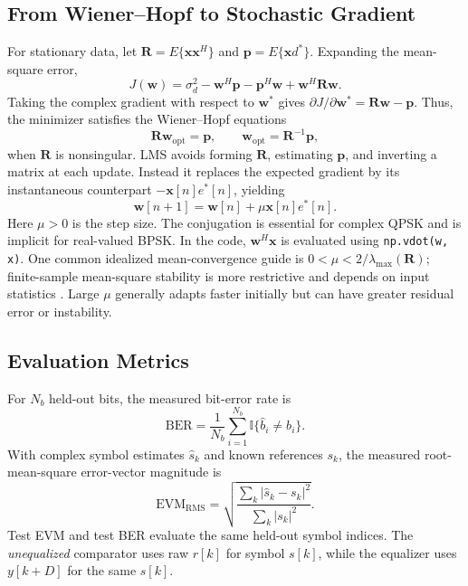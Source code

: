 \documentclass[conference,10pt]{IEEEtran}
\newcommand{\vect}[1]{\mathbf{#1}}
\begin{document}
\subsection{From Wiener--Hopf to Stochastic Gradient}
For stationary data, let $\vect{R}=E\{\vect{x}\vect{x}^H\}$ and $\vect{p}=E\{\vect{x}d^*\}$. Expanding the mean-square error,
\begin{equation}
 J(\vect{w})=\sigma_d^2-\vect{w}^H\vect{p}-\vect{p}^H\vect{w}
       +\vect{w}^H\vect{R}\vect{w}.
\end{equation}
Taking the complex gradient with respect to $\vect{w}^*$ gives $\partial J/\partial\vect{w}^*=\vect{R}\vect{w}-\vect{p}$. Thus, the minimizer satisfies the Wiener--Hopf equations
\begin{equation}
 \vect{R}\vect{w}_{\mathrm{opt}}=\vect{p},\qquad
 \vect{w}_{\mathrm{opt}}=\vect{R}^{-1}\vect{p},
 \label{eq:wiener}
\end{equation}
when $\vect{R}$ is nonsingular. LMS avoids forming $\vect{R}$, estimating $\vect{p}$, and inverting a matrix at each update. Instead it replaces the expected gradient by its instantaneous counterpart $-\vect{x}[n]e^*[n]$, yielding
\begin{equation}
 \boxed{\vect{w}[n+1]=\vect{w}[n]+\mu\vect{x}[n]e^*[n].}
 \label{eq:lms}
\end{equation}
Here $\mu>0$ is the step size. The conjugation is essential for complex QPSK and is implicit for real-valued BPSK. In the code, $\vect{w}^H\vect{x}$ is evaluated using \texttt{np.vdot(w, x)}. One common idealized mean-convergence guide is $0<\mu<2/\lambda_{\max}(\vect{R})$; finite-sample mean-square stability is more restrictive and depends on input statistics \cite{haykin2002}. Large $\mu$ generally adapts faster initially but can have greater residual error or instability.

\subsection{Evaluation Metrics}
For $N_b$ held-out bits, the measured bit-error rate is
\begin{equation}
 \mathrm{BER}=\frac{1}{N_b}\sum_{i=1}^{N_b}\mathbb{I}\{\hat b_i\ne b_i\}.
\end{equation}
With complex symbol estimates $\hat s_k$ and known references $s_k$, the measured root-mean-square error-vector magnitude is
\begin{equation}
 \mathrm{EVM}_{\mathrm{RMS}}=\sqrt{\frac{\sum_k|\hat s_k-s_k|^2}{\sum_k|s_k|^2}}.
\end{equation}
Test EVM and test BER evaluate the same held-out symbol indices. The \emph{unequalized} comparator uses raw $r[k]$ for symbol $s[k]$, while the equalizer uses $y[k+D]$ for the same $s[k]$.
\end{document}
